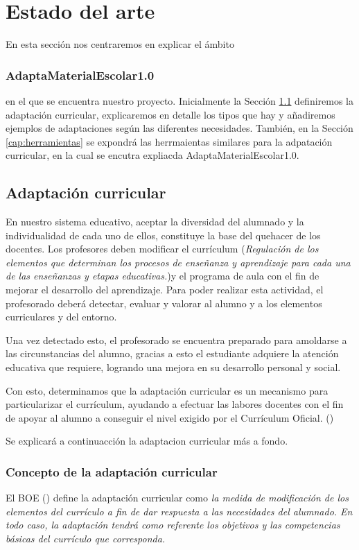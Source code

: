 \chapter{Estado del arte}
\label{cap:estadoDelArte}
En esta sección nos centraremos en explicar el ámbito
\subsection{AdaptaMaterialEscolar1.0}
en el que se encuentra nuestro proyecto. Inicialmente la Sección \ref{cap:adaptacion} definiremos la adaptación curricular, explicaremos en detalle los tipos que hay y añadiremos ejemplos de adaptaciones según las diferentes necesidades. También, en la Sección \ref{cap:herramientas}  se expondrá las herrmaientas similares para la adpatación curricular, en la cual se encutra expliacda AdaptaMaterialEscolar1.0. 

\section{Adaptación curricular}\label{cap:adaptacion}
\nocite{adaptacionCurricular}
\nocite{adaptacionCurricular2}
En nuestro sistema educativo, aceptar la diversidad del alumnado y la individualidad de cada uno de ellos, constituye la base del quehacer de los docentes. Los profesores deben modificar el currículum (\textit{Regulación de los elementos que determinan los procesos de enseñanza y aprendizaje para cada una de las enseñanzas y etapas educativas.})y el programa de aula con el fin de mejorar el desarrollo del aprendizaje. Para poder realizar esta actividad, el profesorado deberá detectar, evaluar y valorar al alumno y a los elementos curriculares y del entorno.

Una vez detectado esto, el profesorado se encuentra preparado para amoldarse a las circunstancias del alumno, gracias a esto el estudiante adquiere la atención educativa que requiere, logrando una mejora en su desarrollo personal y social.

Con esto, determinamos que la adaptación curricular es un mecanismo para particularizar el currículum, ayudando a efectuar las labores docentes con el fin de apoyar al alumno a conseguir el nivel exigido por el Currículum Oficial. (\cite{adaptacionIntro})

Se explicará a continuacción la adaptacion curricular más a fondo.

\subsection{Concepto de la adaptación curricular}
El BOE (\citeyear{BOE}) define la adaptación curricular como \textit{la medida de modificación de los elementos del currículo a fin de dar respuesta a las necesidades del alumnado. En todo caso, la adaptación tendrá como referente los objetivos y las competencias básicas del currículo que corresponda.}


